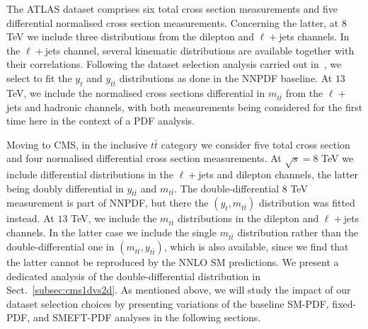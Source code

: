 \documentclass[withindex,glossary]{cam-thesis}
\begin{document}
 The ATLAS dataset comprises six total cross section measurements
 and five differential normalised cross section measurements.
 Concerning the latter, at $8$ TeV we include three distributions
 from the dilepton and $\ell+$jets channels.
%
 In the $\ell+$jets channel, several kinematic distributions are available
 together with their correlations.
 Following the dataset selection analysis carried out in~\cite{NNPDF:2021njg},
 we select to fit the $y_t$ and $y_{t\bar{t}}$ distributions as done in the
 NNPDF baseline.
%
 At $13$ TeV, we include the normalised cross sections
 differential in $m_{t\bar{t}}$ from the $\ell+$jets 
 and  hadronic channels, with both measurements being considered
 for the first time here in the context of a PDF analysis.

 Moving to CMS, in the inclusive $t\bar{t}$ category
 we consider five total cross section  and four normalised differential cross section
 measurements.
%
 At $\sqrt{s}=8$ TeV we include differential distributions in the 
 $\ell+$jets and dilepton channels, the latter being doubly differential
 in $y_{t\bar{t}}$ and $m_{t\bar{t}}$.
 The double-differential 8 TeV measurement is part of NNPDF, but there
 the $(y_{t},m_{t\bar{t}})$ distribution was fitted instead.
%
 At $13$ TeV, we include the $m_{t\bar{t}}$  distributions
 in the dilepton and $\ell+$jets channels.
 In the latter case we  include the single $m_{t\bar{t}}$ distribution
 rather than the double-differential one in $(m_{t\bar{t}},
 y_{t\bar{t}})$, which is also available, since we find that the
 latter cannot be reproduced by the NNLO SM predictions. We present a
 dedicated analysis of the double-differential distribution in Sect.~\ref{subsec:cms1dvs2d}.
 As mentioned above, we will study the impact of our dataset selection choices
 by presenting variations of the baseline SM-PDF, fixed-PDF, and SMEFT-PDF analyses
 in the following sections.


\end{document}
